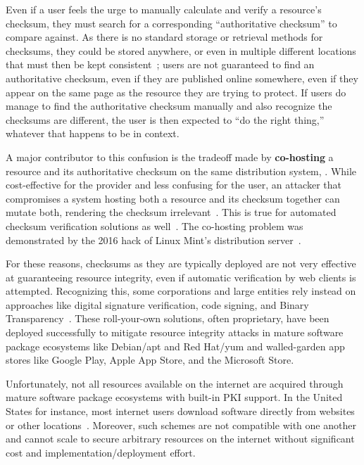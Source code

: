 Even if a user feels the urge to manually calculate and verify a resource's
checksum, they must search for a corresponding ``authoritative checksum'' to
compare against. As there is no standard storage or retrieval methods for
checksums, they could be stored anywhere, or even in multiple different
locations that must then be kept consistent~\cite{Cherubini}; users are not
guaranteed to find an authoritative checksum, even if they are published online
somewhere, even if they appear on the same page as the resource they are trying
to protect. If users do manage to find the authoritative checksum manually and
also recognize the checksums are different, the user is then expected to ``do
the right thing,'' whatever that happens to be in context.

A major contributor to this confusion is the tradeoff made by
\textbf{co-hosting} a resource and its authoritative checksum on the same
distribution system, . While
cost-effective for the provider and less confusing for the user, an attacker
that compromises a system hosting both a resource and its checksum together can
mutate both, rendering the checksum irrelevant~\cite{Stickler}. This is true for
automated checksum verification solutions as well~\cite{Cherubini}. The
co-hosting problem was demonstrated by the 2016 hack of Linux Mint's
distribution server~\cite{SCA-MINT1, SCA-MINT2}.

For these reasons, checksums as they are typically deployed are not very
effective at guaranteeing resource integrity, even if automatic verification by
web clients is attempted. Recognizing this, some corporations and large entities
rely instead on approaches like digital signature verification, code signing,
and Binary Transparency~\cite{PKI, BinaryTransparency}. These roll-your-own
solutions, often proprietary, have been deployed successfully to mitigate
resource integrity attacks in mature software package ecosystems like Debian/apt
and Red Hat/yum and walled-garden app stores like Google Play, Apple App Store,
and the Microsoft Store.

Unfortunately, not all resources available on the internet are acquired through
mature software package ecosystems with built-in PKI support. In the United
States for instance, most internet users download software directly from
websites or other locations~\cite{Cherubini, Ryan}. 
Moreover, such schemes are not
compatible with one another and cannot scale to secure arbitrary resources on
the internet without significant cost and implementation/deployment effort.

